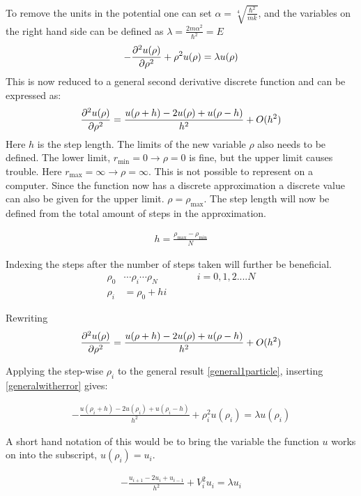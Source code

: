 To remove the units in the potential one can set $\alpha=\sqrt[4]{\frac{\hbar^2}{mk}}$, and the variables on the right hand side can be defined as $\lambda=\frac{2m\alpha^2}{\hbar^2}=E$
\begin{align}
	-\pdv[2]{u(\rho)}{\rho}+\rho^2u(\rho)=\lambda u(\rho)\label{general1particle}
\end{align}
This is now reduced to a general second derivative discrete function and can be expressed as:
\begin{align}
	\pdv[2]{u(\rho)}{\rho}=\frac{u(\rho+h)-2u(\rho)+u(\rho-h)}{h^2}+O(h^2)\label{generalwitherror}
\end{align}
Here $h$ is the step length. The limits of the new variable $\rho$ also needs to be defined. The lower limit, $r_{\mathrm{min}}=0\to\rho=0$ is fine, but the upper limit causes trouble. Here  $r_{\mathrm{max}}=\infty\to\rho=\infty$. This is not possible to represent on a computer. Since the function now has a discrete approximation a discrete value can also be given for the upper limit. $\rho=\rho_\mathrm{max}$. The step length will now be defined from the total amount of steps in the approximation.

\begin{align*}
	h=\frac{\rho_\mathrm{max}-\rho_\mathrm{min}}{N}
\end{align*} 

Indexing the steps after the number of steps taken will further be beneficial.
\begin{align*}
	\rho_0&\cdots\rho_i\cdots\rho_N \qquad \qquad i=0,1,2....N\\
	\rho_i&=\rho_0+hi
\end{align*}

Rewriting 
\begin{align}
	\pdv[2]{u(\rho)}{\rho}=\frac{u(\rho+h)-2u(\rho)+u(\rho-h)}{h^2}+O(h^2)
\end{align}

Applying the step-wise $\rho_i$ to the general result \ref{general1particle}, inserting \ref{generalwitherror} gives:

\begin{align*}
	-\frac{u(\rho_i+h)-2u(\rho_i)+u(\rho_i-h)}{h^2}+\rho_i^2u(\rho_i)=\lambda u(\rho_i)	
\end{align*}

A short hand notation of this would be to bring the variable the function $u$ works on into the subscript, $u(\rho_i)=u_i$.

\begin{align}
	-\frac{u_{i+1}-2u_i+u_{i-1}}{h^2}+V_i^2u_i=\lambda u_i
\end{align}

